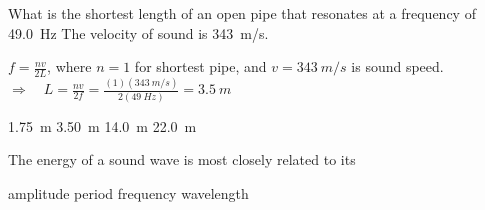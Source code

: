 \documentclass[answers]{exam}
\begin{document}
\begin{questions}
\question
What is the shortest length of an open pipe that resonates at a frequency of \SI{49.0}{Hz} The velocity of sound is \SI{343}{m/s}.

\begin{center}
\end{center}

\ifprintanswers
{\color{red}
$f = \frac{nv}{2L}$, where $n=1$ for shortest pipe, and $v = \SI{343}{m/s}$ is sound speed. $\Rightarrow \quad L = \frac{nv}{2f} = \frac{(1)(\SI{343}{m/s})}{2(\SI{49}{Hz})} = \boxed{\SI{3.5}{m}}$
}
\fi

\begin{randomizechoices}
    \choice \SI{1.75}{m}
    \correctchoice \SI{3.50}{m}
    \choice \SI{14.0}{m}
    \choice \SI{22.0}{m}
\end{randomizechoices}

\question
The energy of a sound wave is most closely related to its

\begin{randomizechoices}
    \correctchoice amplitude
    \choice period
    \choice frequency
    \choice wavelength
\end{randomizechoices}




\end{questions}
\end{document}
